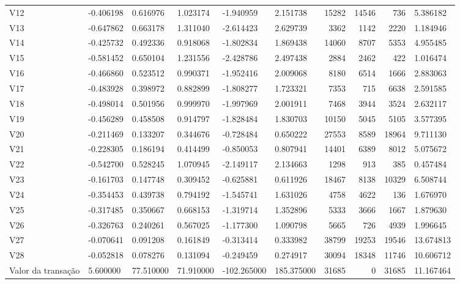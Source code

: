 \begin{longtable}{llllllrrrl}
V12 & -0.406198 & 0.616976 & 1.023174 & -1.940959 & 2.151738 & 15282 & 14546 & 736 & 5.386182 \\
V13 & -0.647862 & 0.663178 & 1.311040 & -2.614423 & 2.629739 & 3362 & 1142 & 2220 & 1.184946 \\
V14 & -0.425732 & 0.492336 & 0.918068 & -1.802834 & 1.869438 & 14060 & 8707 & 5353 & 4.955485 \\
V15 & -0.581452 & 0.650104 & 1.231556 & -2.428786 & 2.497438 & 2884 & 2462 & 422 & 1.016474 \\
V16 & -0.466860 & 0.523512 & 0.990371 & -1.952416 & 2.009068 & 8180 & 6514 & 1666 & 2.883063 \\
V17 & -0.483928 & 0.398972 & 0.882899 & -1.808277 & 1.723321 & 7353 & 715 & 6638 & 2.591585 \\
V18 & -0.498014 & 0.501956 & 0.999970 & -1.997969 & 2.001911 & 7468 & 3944 & 3524 & 2.632117 \\
V19 & -0.456289 & 0.458508 & 0.914797 & -1.828484 & 1.830703 & 10150 & 5045 & 5105 & 3.577395 \\
V20 & -0.211469 & 0.133207 & 0.344676 & -0.728484 & 0.650222 & 27553 & 8589 & 18964 & 9.711130 \\
V21 & -0.228305 & 0.186194 & 0.414499 & -0.850053 & 0.807941 & 14401 & 6389 & 8012 & 5.075672 \\
V22 & -0.542700 & 0.528245 & 1.070945 & -2.149117 & 2.134663 & 1298 & 913 & 385 & 0.457484 \\
V23 & -0.161703 & 0.147748 & 0.309452 & -0.625881 & 0.611926 & 18467 & 8138 & 10329 & 6.508744 \\
V24 & -0.354453 & 0.439738 & 0.794192 & -1.545741 & 1.631026 & 4758 & 4622 & 136 & 1.676970 \\
V25 & -0.317485 & 0.350667 & 0.668153 & -1.319714 & 1.352896 & 5333 & 3666 & 1667 & 1.879630 \\
V26 & -0.326763 & 0.240261 & 0.567025 & -1.177300 & 1.090798 & 5665 & 726 & 4939 & 1.996645 \\
V27 & -0.070641 & 0.091208 & 0.161849 & -0.313414 & 0.333982 & 38799 & 19253 & 19546 & 13.674813 \\
V28 & -0.052818 & 0.078276 & 0.131094 & -0.249459 & 0.274917 & 30094 & 18348 & 11746 & 10.606712 \\
Valor da transação & 5.600000 & 77.510000 & 71.910000 & -102.265000 & 185.375000 & 31685 & 0 & 31685 & 11.167464 \\
\end{longtable}
